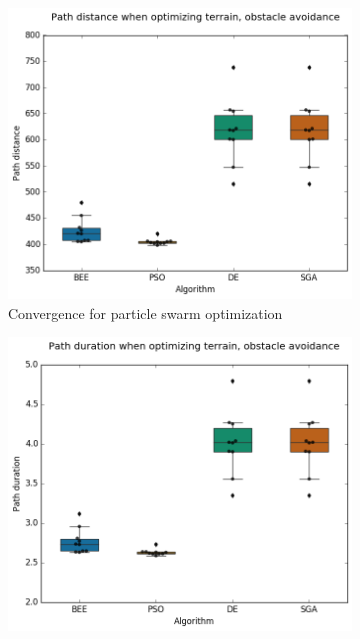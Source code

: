 \documentclass{tamuccthesis}
\begin{document}
\begin{figure}
    \captionsetup{justification=centering}
    \centering
    \begin{subfigure}[b]{0.475\textwidth}
        \centering
        \includegraphics[width=\textwidth]{EXP3_histo_distance_a.png}
        \caption[]{{\small Convergence for particle swarm optimization}}
        \label{fig:algcompare_a_distance}
    \end{subfigure}
    \hfill
    \begin{subfigure}[b]{0.475\textwidth}  
        \centering 
        \includegraphics[width=\textwidth]{EXP3_histo_duration_a.png}

\end{subfigure}
\end{figure}
\end{document}
